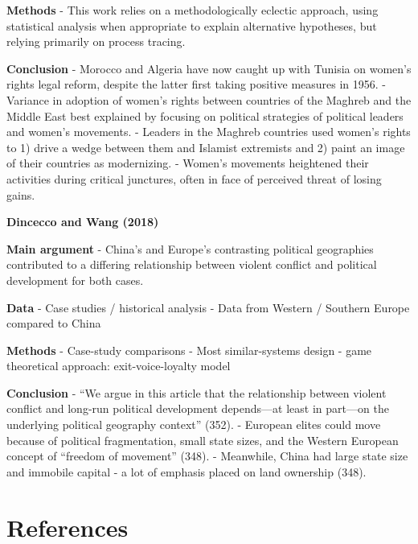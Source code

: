 \documentclass[
  english,
  man]{apa6}
\begin{document}
\textbf{Methods}
- This work relies on a methodologically eclectic approach, using statistical analysis when appropriate to explain alternative hypotheses, but relying primarily on process tracing.

\textbf{Conclusion}
- Morocco and Algeria have now caught up with Tunisia on women's rights legal reform, despite the latter first taking positive measures in 1956.
- Variance in adoption of women's rights between countries of the Maghreb and the Middle East best explained by focusing on political strategies of political leaders and women's movements. - Leaders in the Maghreb countries used women's rights to 1) drive a wedge between them and Islamist extremists and 2) paint an image of their countries as modernizing.
- Women's movements heightened their activities during critical junctures, often in face of perceived threat of losing gains.

\textbf{Dincecco and Wang (2018)}

\textbf{Main argument}
- China's and Europe's contrasting political geographies contributed to a differing relationship between violent conflict and political development for both cases.

\textbf{Data}
- Case studies / historical analysis
- Data from Western / Southern Europe compared to China

\textbf{Methods}
- Case-study comparisons
- Most similar-systems design
- game theoretical approach: exit-voice-loyalty model

\textbf{Conclusion}
- ``We argue in this article that the relationship between violent conflict and long-run political development depends---at least in part---on the underlying political geography context'' (352).
- European elites could move because of political fragmentation, small state sizes, and the Western European concept of ``freedom of movement'' (348).
- Meanwhile, China had large state size and immobile capital - a lot of emphasis placed on land ownership (348).

\newpage

\hypertarget{references}{%
\section{References}\label{references}}

\begingroup
\setlength{\parindent}{-0.5in}
\setlength{\leftskip}{0.5in}
\end{document}
